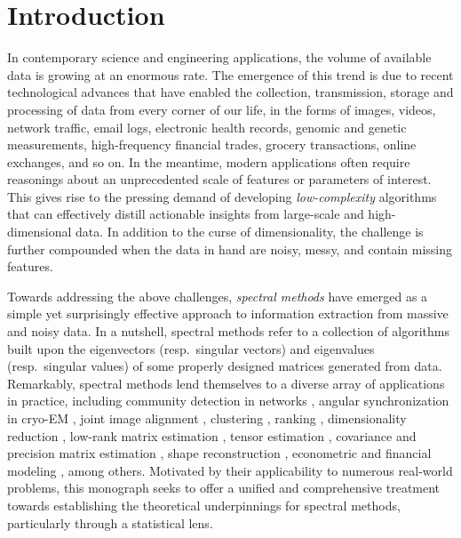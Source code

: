 \chapter{Introduction}
\label{cha:introduction}

In contemporary science and engineering applications, the volume of available data  is growing at an enormous rate. The emergence of this trend is  due to recent technological advances that have enabled the collection, transmission, storage and processing of data from every corner of our life, in the forms of images, videos, network traffic, email logs, electronic health records, genomic and genetic measurements, high-frequency financial trades, grocery transactions, online exchanges, and so on.
In the meantime, modern applications often require reasonings about an unprecedented scale of features or parameters of interest.
This gives rise to the pressing demand of developing {\em low-complexity} algorithms that can effectively distill actionable insights from large-scale and high-dimensional data. In addition to the curse of dimensionality, the challenge is further compounded when the data in hand are  noisy, messy, and contain missing features.



Towards addressing the above challenges, \emph{spectral methods} have emerged as a simple yet surprisingly effective approach to information extraction from massive and noisy data. In a nutshell, spectral methods refer to a collection of algorithms built upon the eigenvectors (resp.~singular vectors) and eigenvalues (resp.~singular values) of some properly designed  matrices generated from data. Remarkably, spectral methods lend themselves to a diverse array of applications in practice, including community detection in networks \citep{newman2006finding,abbe2017community,rohe2011spectral,mcsherry2001spectral}, angular synchronization in cryo-EM \citep{singer2011three,singer2011angular}, joint image alignment \citep{chen2016projected}, clustering \citep{von2007tutorial,ng2002spectral}, ranking \citep{negahban2016rank,chen2015spectral,chen2017spectral}, dimensionality reduction \citep{belkin2003laplacian}, low-rank matrix estimation \citep{achlioptas2007fast, keshavan2010matrix}, tensor estimation \citep{montanari2016spectral,cai2019tensor},  covariance and precision matrix estimation \citep{fan2013large,fan2020robust}, shape reconstruction \citep{li2004fast}, econometric and financial modeling \citep{fan2021recent}, among others.
Motivated by their applicability to numerous real-world problems, this monograph seeks to offer a unified and comprehensive treatment towards establishing the theoretical underpinnings for spectral methods, particularly through a statistical lens.






